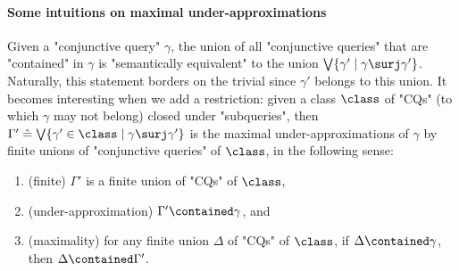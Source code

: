 
\paragraph*{Some intuitions on maximal under-approximations}
Given a "conjunctive query" $\gamma$,
the union of all "conjunctive queries"
that are "contained" in $\gamma$ is "semantically equivalent" to the union
$\bigvee \{ \gamma' \mid \gamma \surj \gamma' \}$. Naturally, this statement borders on the trivial since $\gamma'$ belongs to this union. It becomes interesting when we add a restriction:
given a class $\class$ of "CQs" (to which $\gamma$ may not belong) closed under "subqueries", then $\Gamma' \defeq \bigvee \{ \gamma' \in \class \mid \gamma \surj \gamma' \}$ is the maximal under-approximations
of $\gamma$ by finite unions of "conjunctive queries" of $\class$, in the following sense:
\begin{enumerate}[label=\roman*.]
	\item (finite) $\Gamma'$ is a finite union of "CQs" of $\class$,
	\item (under-approximation) $\Gamma' \contained \gamma$, and
	\item (maximality) for any finite union $\Delta$ of "CQs" of $\class$, if $\Delta \contained \gamma$, then $\Delta \contained \Gamma'$.
\end{enumerate}

